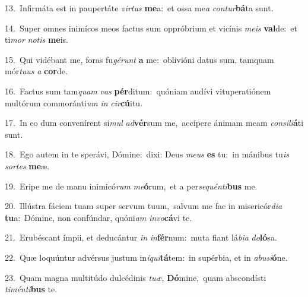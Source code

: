 {\numbfont\textcolor{\numbcolor}{13.}}~Infirmáta est in paupertáte \textit{vir}\-\textit{tus} \textbf{me}\-a:~\star et ossa me\textit{a} \textit{con}\-\textit{tur}\textbf{bá}ta sunt.\par
{\numbfont\textcolor{\numbcolor}{14.}}~Super omnes inimícos meos factus sum oppróbrium et vicínis \textit{me}\-\textit{is} \textbf{val}\-de:~\star et ti\textit{mor} \textit{no}\-\textit{tis} \textbf{me}\-is.\par
{\numbfont\textcolor{\numbcolor}{15.}}~Qui vidébant me, foras fu\-\textit{gé}\-\textit{runt} \textbf{a} me:~\star oblivióni datus sum, tamquam mór\-\textit{tu}\-\textit{us} \textit{a} \textbf{cor}\-de.\par
{\numbfont\textcolor{\numbcolor}{16.}}~Factus sum tam\textit{quam} \textit{vas} \textbf{pér}\-ditum:~\star quóniam audívi vituperatiónem multórum commoránti\textit{um} \textit{in} \textit{cir}\-\textbf{cú}itu.\par
{\numbfont\textcolor{\numbcolor}{17.}}~In eo dum convenírent si\textit{mul} \textit{ad}\-\textbf{vér}sum me,~\star accípere ánimam meam \textit{con}\-\textit{si}\textit{li}\textbf{á}ti sunt.\par
{\numbfont\textcolor{\numbcolor}{18.}}~Ego autem in te sperávi, Dómine:~\dagger dixi: Deus \textit{me}\-\textit{us} \textbf{es} tu:~\star in mánibus tu\textit{is} \textit{sor}\-\textit{tes} \textbf{me}\-æ.\par
{\numbfont\textcolor{\numbcolor}{19.}}~Eripe me de manu inimicó\textit{rum} \textit{me}\-\textbf{ó}rum,~\star et a per\-\textit{se}\-\textit{quén}\textit{ti}\textbf{bus} me.\par
{\numbfont\textcolor{\numbcolor}{20.}}~Illústra fáciem tuam super servum tuum,~\dagger salvum me fac in misericór\-\textit{di}\-\textit{a} \textbf{tu}\-a:~\star Dómine, non confúndar, quóni\textit{am} \textit{in}\-\textit{vo}\textbf{cá}vi te.\par
{\numbfont\textcolor{\numbcolor}{21.}}~Erubéscant ímpii, et deducántur \textit{in} \textit{in}\-\textbf{fér}num:~\star muta fiant lá\-\textit{bi}\-\textit{a} \textit{do}\-\textbf{ló}sa.\par
{\numbfont\textcolor{\numbcolor}{22.}}~Quæ loquúntur advérsus justum in\-\textit{i}\-\textit{qui}\textbf{tá}tem:~\star in supérbia, et in \textit{ab}\-\textit{u}\textit{si}\textbf{ó}ne.\par
{\numbfont\textcolor{\numbcolor}{23.}}~Quam magna multitúdo dulcédinis \textit{tu}\-\textit{æ}, \textbf{Dó}\-mine,~\star quam abscondísti \textit{ti}\-\textit{mén}\textit{ti}\textbf{bus} te.\par

